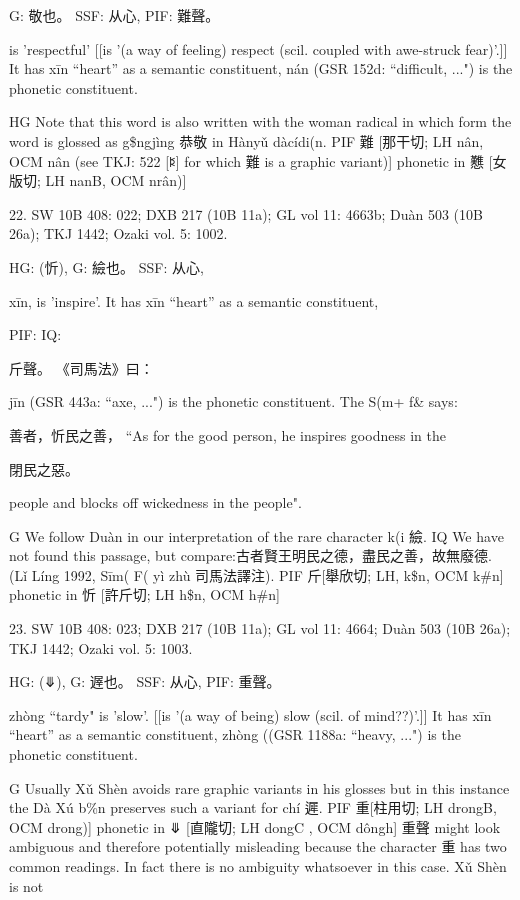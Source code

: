G:	敬也。
SSF: 从心,
PIF: 難聲。

is 'respectful' [[is '(a way of feeling) respect (scil. coupled with awe-struck fear)'.]]
It has xīn ``heart'' as a semantic constituent,
nán (GSR 152d: ``difficult, ...") is the phonetic constituent.

HG Note that this word is also written with the woman radical in which form the word is glossed as g\$ngjìng 恭敬 in Hànyǔ dàcídi(n.
PIF     難 [那干切; LH nân, OCM nân (see TKJ: 522 [ꌅ] for which 難 is a graphic variant)] phonetic in 戁 [女版切; LH nanB, OCM nrân)]

22. SW 10B 408: 022; DXB 217 (10B 11a); GL vol 11: 4663b; Duàn 503 (10B 26a); TKJ 1442; Ozaki vol. 5: 1002.


HG:             (忻),
G:	䌞也。
SSF: 从心,


xīn,
is 'inspire'.
It has xīn ``heart'' as a semantic constituent,

PIF: IQ:

斤聲。
《司馬法》曰：

jīn (GSR 443a: ``axe, ...") is the phonetic constituent. The S(m+ f& says:

善者，忻民之善， ``As for the good person, he inspires goodness in the

閉民之惡。

people and blocks off wickedness in the people".

G	We follow Duàn in our interpretation of the rare character k(i 䌞.
IQ	We have not found this passage, but compare:古者賢王明民之德，盡民之善，故無廢德. (Lǐ Líng 1992, Sīm( F( yì zhù 司馬法譯注).
PIF     斤[舉欣切; LH, k\$n, OCM k\#n] phonetic in 忻 [許斤切; LH h\$n, OCM h\#n]

23. SW 10B 408: 023; DXB 217 (10B 11a); GL vol 11: 4664; Duàn 503 (10B 26a); TKJ 1442; Ozaki vol. 5: 1003.


HG:	(⤋),
G:	遟也。
SSF: 从心,
PIF: 重聲。

zhòng ``tardy"
is 'slow'. [[is '(a way of being) slow (scil. of mind??)'.]] It has xīn ``heart'' as a semantic constituent,
zhòng ((GSR 1188a: ``heavy, ...") is the phonetic constituent.

G	Usually Xǔ Shèn avoids rare graphic variants in his glosses but in this instance the Dà Xú b\%n
preserves such a variant for chí 遲.
PIF     重[柱用切; LH drongB, OCM drong)] phonetic in ⤋ [直隴切; LH dongC , OCM dôngh]
    重聲 might look ambiguous and therefore potentially misleading because the character 重 has two common readings. In fact there is no ambiguity whatsoever in this case. Xǔ Shèn is not




